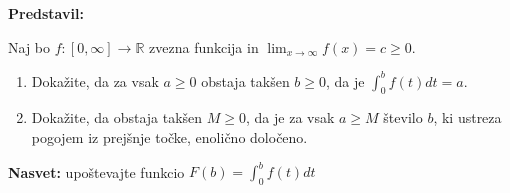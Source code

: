 \textbf{Predstavil: }

Naj bo $f: [0, \infty] \to \mathbb{R}$ zvezna funkcija in $\displaystyle \lim_{x \to \infty} f(x) = c \geq 0$.
\begin{enumerate}
  \item Dokažite, da za vsak $a \geq 0$ obstaja takšen $b \geq 0$, da je $\displaystyle \int_{0}^{b} f(t)dt = a$.
  \item Dokažite, da obstaja takšen $M \geq 0$, da je za vsak $a \geq M$ število $b$, ki ustreza pogojem iz prejšnje točke, enolično določeno.
\end{enumerate}
\textbf{Nasvet:} upoštevajte funkcio $F(b)= \displaystyle \int_{0}^{b} f(t) dt$